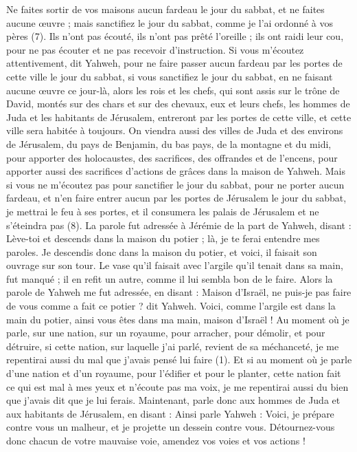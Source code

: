 \begin{multicols}{2}
Ne faites sortir de vos maisons aucun fardeau le jour du sabbat, et ne faites aucune œuvre ; mais sanctifiez le jour du sabbat, comme je l'ai ordonné à vos pères\FTNT{} (7).
Ils n'ont pas écouté, ils n'ont pas prêté l’oreille ; ils ont raidi leur cou, pour ne pas écouter et ne pas recevoir d'instruction.
Si vous m'écoutez attentivement, dit Yahweh, pour ne faire passer aucun fardeau par les portes de cette ville le jour du sabbat, si vous sanctifiez le jour du sabbat, en ne faisant aucune œuvre ce jour-là,
alors les rois et les chefs, qui sont assis sur le trône de David, montés sur des chars et sur des chevaux, eux et leurs chefs, les hommes de Juda et les habitants de Jérusalem, entreront par les portes de cette ville, et cette ville sera habitée à toujours.
On viendra aussi des villes de Juda et des environs de Jérusalem, du pays de Benjamin, du bas pays, de la montagne et du midi, pour apporter des holocaustes, des sacrifices, des offrandes et de l'encens, pour apporter aussi des sacrifices d'actions de grâces dans la maison de Yahweh.
Mais si vous ne m'écoutez pas pour sanctifier le jour du sabbat, pour ne porter aucun fardeau, et n'en faire entrer aucun par les portes de Jérusalem le jour du sabbat, je mettrai le feu à ses portes, et il consumera les palais de Jérusalem et ne s’éteindra pas\FTNT{} (8).
\VerseOne{}La parole fut adressée à Jérémie de la part de Yahweh, disant :
Lève-toi et descends dans la maison du potier ; là, je te ferai entendre mes paroles.
Je descendis donc dans la maison du potier, et voici, il faisait son ouvrage sur son tour.
Le vase qu'il faisait avec l'argile qu’il tenait dans sa main, fut manqué ; il en refit un autre, comme il lui sembla bon de le faire.
Alors la parole de Yahweh me fut adressée, en disant :
Maison d'Israël, ne puis-je pas faire de vous comme a fait ce potier ? dit Yahweh. Voici, comme l'argile est dans la main du potier, ainsi vous êtes dans ma main, maison d'Israël !
Au moment où je parle, sur une nation, sur un royaume, pour arracher, pour démolir, et pour détruire,
si cette nation, sur laquelle j'ai parlé, revient de sa méchanceté, je me repentirai aussi du mal que j'avais pensé lui faire\FTNT{} (1).
Et si au moment où je parle d'une nation et d'un royaume, pour l'édifier et pour le planter,
cette nation fait ce qui est mal à mes yeux et n'écoute pas ma voix, je me repentirai aussi du bien que j'avais dit que je lui ferais.
Maintenant, parle donc aux hommes de Juda et aux habitants de Jérusalem, en disant : Ainsi parle Yahweh : Voici, je prépare contre vous un malheur, et je projette un dessein contre vous. Détournez-vous donc chacun de votre mauvaise voie, amendez vos voies et vos actions !

\end{multicols}
